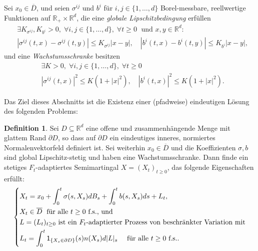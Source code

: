 \documentclass[10pt, a4paper, leqno, twoside, bibliography=totocnumbered, final]{scrartcl}
\theoremstyle{definition}
\newtheorem{defin}{Definition}[section]
\theoremstyle{plain}%
\theoremstyle{remark}
\begin{document}
Sei $ x_{0} \in \overline{D} $, und seien $ \sigma^{ij} $ und $ b^{i} $ für $ i,j \in \{ 1, \dots , d \} $ Borel-messbare, reellwertige Funktionen auf $ \mathbb{R}_{+} \times \mathbb{R}^{d} $, die eine \emph{globale Lipschitzbedingung} erfüllen
\begin{align*}
& \exists  K_{\sigma^{ij}},K_{b^i} > 0, \; \forall i,j \in \{ 1, \dots , d \},  \; \forall t \geq 0 \; \text{ und } x,y \in \mathbb{R}^{d}: \\ \tag{L}
 &| \sigma^{ij}(t,x) - \sigma^{ij}(t,y) | \leq K_{\sigma^{ij}} | x - y |,  \quad | b^{i}(t,x) - b^{i}(t,y) | \leq K_{b^i} | x - y |,  
\end{align*}
und eine \emph{Wachstumsschranke} besitzen
\begin{align*}
&\exists K > 0, \; \forall i,j \in \{ 1, \dots , d \},  \; \forall t \geq 0 \\
&| \sigma^{ij}(t,x) |^{2} \leq K (1 + | x |^{2} ),  \quad | b^{i}(t,x) |^{2} \leq K (1 + | x |^{2} ). \tag{W}
\end{align*}

Das Ziel dieses Abschnitts ist die Existenz einer (pfadweise) eindeutigen Lösung des folgenden Problems:

\begin{defin}
Sei $ D \subseteq \mathbb{R}^{d} $ eine offene und zusammenhängende Menge mit glattem Rand $ \partial D $, so dass auf $ \partial D $ ein eindeutiges inneres, normiertes Normalenvektorfeld definiert ist. Sei weiterhin $ x_{0} \in \overline{D} $ und die Koeffizienten $ \sigma, b $ sind global Lipschitz-stetig und haben eine Wachstumsschranke. Dann finde ein stetiges $ F_{t} $-adaptiertes Semimartingal $ X = (X_{t})_{t \geq 0} $, das folgende Eigenschaften erfüllt:
\begin{equation}
\label{eq:SDE}
\left \{ \begin{aligned} 
& X_{t} = x_{0} + \int_{0}^{t} \sigma (s, X_{s}) dB_{s} + \int_0^t b(s,X_{s})ds + L_{t}, \\ 
& X_{t} \in \overline{D} \; \text{ für alle $ t \geq 0 $ f.s., und} \\ 
& \text{$ L = (L_{t})_{t \geq 0} $ ist ein $ F_t $-adaptierter Prozess von beschränkter Variation mit} \\
& L_{t} = \int_{0}^{t} \mathsf{1}_{\{X_{s} \in \partial D \} }(s) n(X_{s}) d|L|_{s} \quad \text{ für alle $ t \geq 0 $ f.s..}
\end{aligned} \right .
\end{equation}
\end{defin}
\end{document}
